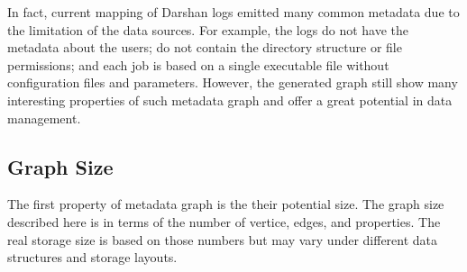 In fact, current mapping of Darshan logs emitted many common metadata due to the limitation of the data sources. For example, the logs do not have the metadata about the users; do not contain the directory structure or file permissions; and each job is based on a single executable file without configuration files and parameters. However, the generated graph still show many interesting properties of such metadata graph and offer a great potential in data management.

\subsection{Graph Size}

The first property of metadata graph is the their potential size. The graph size described here is in terms of the number of vertice, edges, and properties\footnotemark. The real storage size is based on those numbers but may vary under different data structures and storage layouts. 


